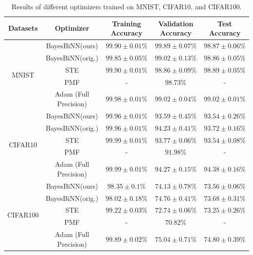 \begin{table}[h]
\begin{center}
\begin{tabular}{ | c | c | c | c | c | }
\hline
 Datasets & Optimizer & Training Accuracy & Validation Accuracy & Test Accuracy \\ \hline
  \multirow{5}{4em}{MNIST} 
   & BayesBiNN(ours) & $99.90 \pm 0.01\%$ & $99.89 \pm 0.07\%$ & $98.87 \pm 0.06\%$  \\
   & BayesBiNN(orig.) & $99.85 \pm 0.05\%$ & $99.02 \pm 0.13\%$ & $98.86 \pm 0.05\%$  \\
   & STE & $99.90 \pm 0.01\%$ & $98.86 \pm 0.09\%$ & $98.89 \pm 0.05\%$  \\
   & PMF & - & $98.73\%$ & -  \\
   & Adam (Full Precision) & $99.98 \pm 0.01\%$ & $99.02 \pm 0.04\%$ & $99.02 \pm 0.01\%$  \\ 
\hline

  \multirow{5}{4em}{CIFAR10}
   & BayesBiNN(ours) & $99.96 \pm 0.01\%$ & $93.59 \pm 0.45\%$ & $93.54 \pm 0.26\%$  \\
   & BayesBiNN(orig.) & $99.96 \pm 0.01\%$ & $94.23 \pm 0.41\%$ & $93.72 \pm 0.16\%$  \\
   & STE & $99.99 \pm 0.01\%$ & $93.77 \pm 0.06\%$ & $93.54 \pm 0.08\%$  \\
   & PMF & - & $91.98\%$ & -  \\
   & Adam (Full Precision) & $99.99 \pm 0.01\%$ & $94.27 \pm 0.15\%$ & $94.38 \pm 0.16\%$  \\ 
\hline
   
   
  \multirow{5}{4em}{CIFAR100} 
   & BayesBiNN(ours) & $98.35 \pm 0.1\%$ & $74.13 \pm 0.78\%$ & $73.56 \pm 0.06 \%$ \\
   & BayesBiNN(orig.) & $98.02 \pm 0.18\%$ & $74.76 \pm 0.41\%$ & $73.68 \pm 0.31\%$  \\
   & STE & $99.22 \pm 0.03\%$ & $72.74 \pm 0.06\%$ & $73.25 \pm 0.26\%$  \\
   & PMF & - & $70.82\%$ & -  \\
   & Adam (Full Precision) & $99.89 \pm 0.02\%$ & $75.04 \pm 0.71\%$ & $74.80 \pm 0.39\%$  \\ \hline
\end{tabular}
\caption{Results of different optimizers trained on MNIST, CIFAR10, and CIFAR100.}
\label{tab:result_1}

\end{center}
\end{table}

